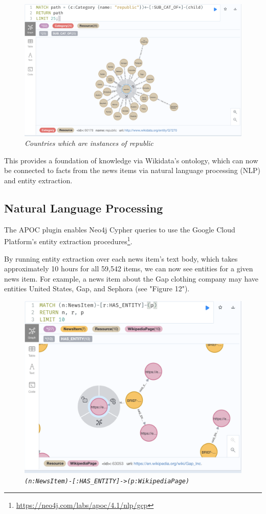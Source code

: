 \documentclass[11pt]{article}
\begin{document}
\begin{figure}
  \centerline{\includegraphics[scale=0.5]{category-republic.png}}
  \caption{\textit{Countries which are instances of republic}}
\end{figure}

This provides a foundation of knowledge via Wikidata's ontology, which can now be connected to facts from the news items via natural language processing (NLP) and entity extraction.

\subsection{Natural Language Processing}

The APOC plugin enables Neo4j Cypher queries to use the Google Cloud Platform's entity extraction procedures\footnote{\url{https://neo4j.com/labs/apoc/4.1/nlp/gcp}}.

By running entity extraction over each news item's text body, which takes approximately 10 hours for all 59,542 items, we can now see entities for a given news item. For example, a news item about the Gap clothing company may have entities United States, Gap, and Sephora (see "Figure 12").

\begin{figure}
  \centerline{\includegraphics[scale=0.5]{has-entity.png}}
  \caption{\textit{\lstinline{(n:NewsItem)-[:HAS_ENTITY]->(p:WikipediaPage)}}}
\end{figure}
\end{document}
